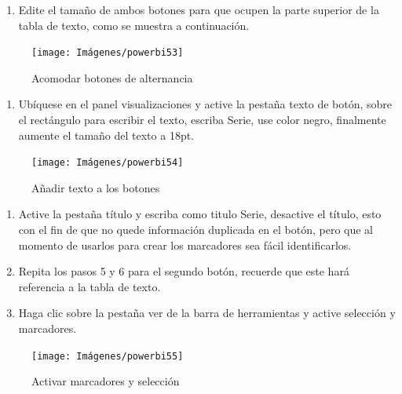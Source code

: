 \documentclass[
]{book}
\providecommand{\tightlist}{%
  \setlength{\itemsep}{0pt}\setlength{\parskip}{0pt}}
\begin{document}
\begin{enumerate}
\def\labelenumi{\arabic{enumi}.}
\setcounter{enumi}{3}
\tightlist
\item
  Edite el tamaño de ambos botones para que ocupen la parte superior de la tabla de texto, como se muestra a continuación.
\end{enumerate}

\begin{figure}

{\centering \texttt{[image: Imágenes/powerbi53]} 

}

\caption{Acomodar botones de alternancia}\label{fig:paso4alternancia-fig}
\end{figure}

\begin{enumerate}
\def\labelenumi{\arabic{enumi}.}
\setcounter{enumi}{4}
\tightlist
\item
  Ubíquese en el panel visualizaciones y active la pestaña texto de botón, sobre el rectángulo para escribir el texto, escriba Serie, use color negro, finalmente aumente el tamaño del texto a 18pt.
\end{enumerate}

\begin{figure}

{\centering \texttt{[image: Imágenes/powerbi54]} 

}

\caption{Añadir texto a los botones}\label{fig:paso5alternancia-fig}
\end{figure}

\begin{enumerate}
\def\labelenumi{\arabic{enumi}.}
\setcounter{enumi}{5}
\item
  Active la pestaña título y escriba como titulo Serie, desactive el título, esto con el fin de que no quede información duplicada en el botón, pero que al momento de usarlos para crear los marcadores sea fácil identificarlos.
\item
  Repita los pasos 5 y 6 para el segundo botón, recuerde que este hará referencia a la tabla de texto.
\item
  Haga clic sobre la pestaña ver de la barra de herramientas y active selección y marcadores.
\end{enumerate}

\begin{figure}

{\centering \texttt{[image: Imágenes/powerbi55]} 

}

\caption{Activar marcadores y selección}\label{fig:paso8alternancia-fig}
\end{figure}
\end{document}
